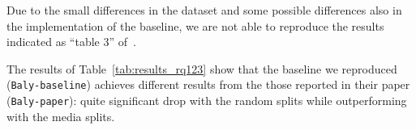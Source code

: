 

Due to the small differences in the dataset and some possible differences also in the implementation of the baseline, we are not able to reproduce the results indicated as ``table 3'' of~\citet{baly2020we}. %

The results of Table~\ref{tab:results_rq123} show that the baseline we reproduced (\texttt{Baly-baseline}) achieves different results from the those reported in their paper (\texttt{Baly-paper}): quite significant drop with the random splits while outperforming with the media splits.







